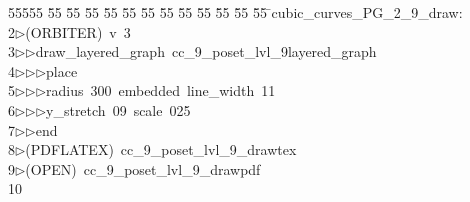 %
%
\begin{tabbing}
55555 \= 55 \= 55 \= 55 \= 55 \= 55 \= 55 \= 55 \= 55 \= 55 \= 55 \= 55 \= 55 \= \>cubic\_curves\_PG\_2\_9\_draw:\\[0pt]
2\>$\triangleright$\>(ORBITER)\ v\ 3\ \\[0pt]
3\>$\triangleright$\>$\triangleright$\>draw\_layered\_graph\ cc\_9\_poset\_lvl\_9layered\_graph\ \\[0pt]
4\>$\triangleright$\>$\triangleright$\>$\triangleright$\>place\ \\[0pt]
5\>$\triangleright$\>$\triangleright$\>$\triangleright$\>radius\ 300\ embedded\ line\_width\ 11\ \\[0pt]
6\>$\triangleright$\>$\triangleright$\>$\triangleright$\>y\_stretch\ 09\ scale\ 025\ \\[0pt]
7\>$\triangleright$\>$\triangleright$\>end\\[0pt]
8\>$\triangleright$\>(PDFLATEX)\ cc\_9\_poset\_lvl\_9\_drawtex\\[0pt]
9\>$\triangleright$\>(OPEN)\ cc\_9\_poset\_lvl\_9\_drawpdf\\[0pt]
10\>\end{tabbing}

